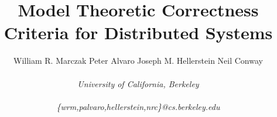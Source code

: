 \documentclass{sig-alternate}
\begin{document}
\title{Model Theoretic Correctness Criteria for Distributed Systems}
%


\author{
%
William R. Marczak \quad Peter Alvaro \quad Joseph M. Hellerstein \quad Neil Conway
\\\\
%
\fontsize{10}{10}\selectfont\itshape 
University of California, Berkeley\\\\ \fontsize{9}{9}\selectfont\ttfamily\upshape
%
\{wrm,palvaro,hellerstein,nrc\}@cs.berkeley.edu
%
}

\toappear{}

\maketitle
\end{document}
